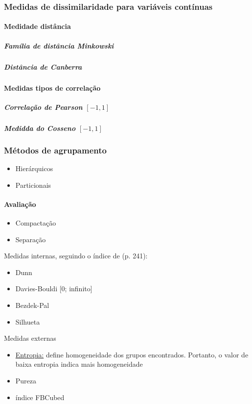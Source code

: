 \subsubsection{Medidas de dissimilaridade para variáveis contínuas}

\paragraph*{Medidade distância}
\subparagraph*{Família de distância Minkowski}
\subparagraph*{Distância de Canberra}

\paragraph*{Medidas tipos de correlação}

\subparagraph*{Correlação de Pearson $ [-1,1] $}
\subparagraph*{Medidda do Cosseno $ [-1,1] $}


\subsubsection{Métodos de agrupamento}

\begin{itemize}
    \item Hierárquicos
    \item Particionais
\end{itemize}


\paragraph*{Avaliação}

\begin{itemize}
    \item Compactação
    \item Separação
\end{itemize}


Medidas internas, seguindo o índice de (p. 241):

\begin{itemize}
    \item Dunn \cite{dunn1973fuzzy}
    \item Davies-Bouldi [0; infinito] \cite{Davies_Bouldin}
    \item Bezdek-Pal \cite{bezdek_pal1998}
    \item Silhueta \cite{rousseeuw1987silhouettes}
\end{itemize}

Medidas externas

\begin{itemize}
    \item \underline{Entropia:} define homogeneidade dos grupos encontrados.
    Portanto, o valor de baixa entropia indica mais homogeneidade
    \item Pureza
    \item índice FBCubed \cite{amigo2009_FBCubed}
\end{itemize}